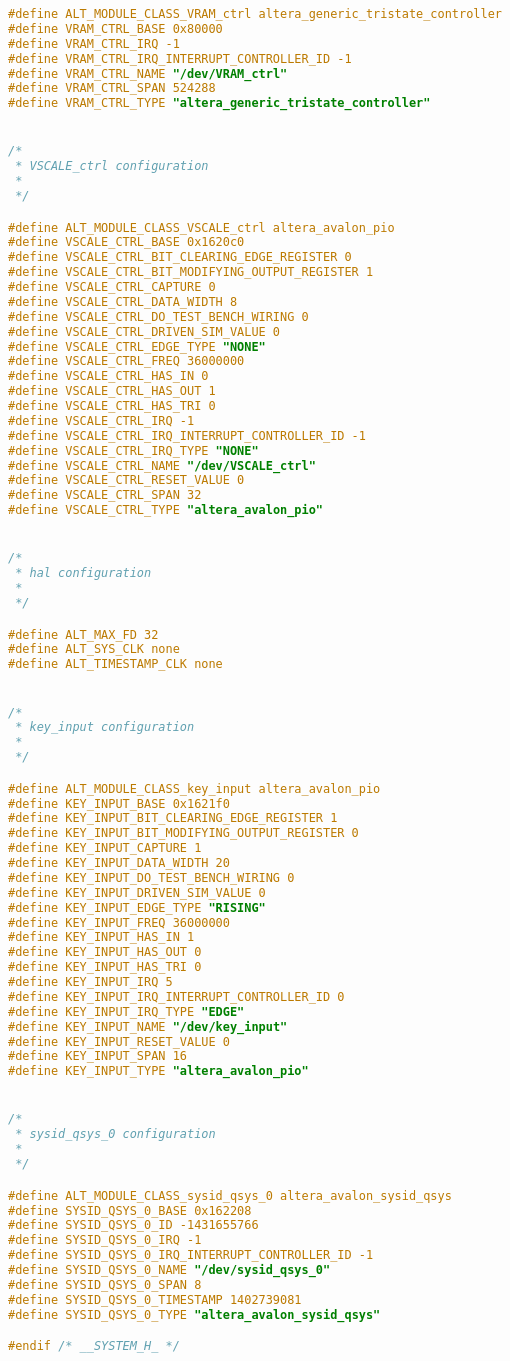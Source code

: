 \begin{lstlisting}[language=C]
#define ALT_MODULE_CLASS_VRAM_ctrl altera_generic_tristate_controller
#define VRAM_CTRL_BASE 0x80000
#define VRAM_CTRL_IRQ -1
#define VRAM_CTRL_IRQ_INTERRUPT_CONTROLLER_ID -1
#define VRAM_CTRL_NAME "/dev/VRAM_ctrl"
#define VRAM_CTRL_SPAN 524288
#define VRAM_CTRL_TYPE "altera_generic_tristate_controller"


/*
 * VSCALE_ctrl configuration
 *
 */

#define ALT_MODULE_CLASS_VSCALE_ctrl altera_avalon_pio
#define VSCALE_CTRL_BASE 0x1620c0
#define VSCALE_CTRL_BIT_CLEARING_EDGE_REGISTER 0
#define VSCALE_CTRL_BIT_MODIFYING_OUTPUT_REGISTER 1
#define VSCALE_CTRL_CAPTURE 0
#define VSCALE_CTRL_DATA_WIDTH 8
#define VSCALE_CTRL_DO_TEST_BENCH_WIRING 0
#define VSCALE_CTRL_DRIVEN_SIM_VALUE 0
#define VSCALE_CTRL_EDGE_TYPE "NONE"
#define VSCALE_CTRL_FREQ 36000000
#define VSCALE_CTRL_HAS_IN 0
#define VSCALE_CTRL_HAS_OUT 1
#define VSCALE_CTRL_HAS_TRI 0
#define VSCALE_CTRL_IRQ -1
#define VSCALE_CTRL_IRQ_INTERRUPT_CONTROLLER_ID -1
#define VSCALE_CTRL_IRQ_TYPE "NONE"
#define VSCALE_CTRL_NAME "/dev/VSCALE_ctrl"
#define VSCALE_CTRL_RESET_VALUE 0
#define VSCALE_CTRL_SPAN 32
#define VSCALE_CTRL_TYPE "altera_avalon_pio"


/*
 * hal configuration
 *
 */

#define ALT_MAX_FD 32
#define ALT_SYS_CLK none
#define ALT_TIMESTAMP_CLK none


/*
 * key_input configuration
 *
 */

#define ALT_MODULE_CLASS_key_input altera_avalon_pio
#define KEY_INPUT_BASE 0x1621f0
#define KEY_INPUT_BIT_CLEARING_EDGE_REGISTER 1
#define KEY_INPUT_BIT_MODIFYING_OUTPUT_REGISTER 0
#define KEY_INPUT_CAPTURE 1
#define KEY_INPUT_DATA_WIDTH 20
#define KEY_INPUT_DO_TEST_BENCH_WIRING 0
#define KEY_INPUT_DRIVEN_SIM_VALUE 0
#define KEY_INPUT_EDGE_TYPE "RISING"
#define KEY_INPUT_FREQ 36000000
#define KEY_INPUT_HAS_IN 1
#define KEY_INPUT_HAS_OUT 0
#define KEY_INPUT_HAS_TRI 0
#define KEY_INPUT_IRQ 5
#define KEY_INPUT_IRQ_INTERRUPT_CONTROLLER_ID 0
#define KEY_INPUT_IRQ_TYPE "EDGE"
#define KEY_INPUT_NAME "/dev/key_input"
#define KEY_INPUT_RESET_VALUE 0
#define KEY_INPUT_SPAN 16
#define KEY_INPUT_TYPE "altera_avalon_pio"


/*
 * sysid_qsys_0 configuration
 *
 */

#define ALT_MODULE_CLASS_sysid_qsys_0 altera_avalon_sysid_qsys
#define SYSID_QSYS_0_BASE 0x162208
#define SYSID_QSYS_0_ID -1431655766
#define SYSID_QSYS_0_IRQ -1
#define SYSID_QSYS_0_IRQ_INTERRUPT_CONTROLLER_ID -1
#define SYSID_QSYS_0_NAME "/dev/sysid_qsys_0"
#define SYSID_QSYS_0_SPAN 8
#define SYSID_QSYS_0_TIMESTAMP 1402739081
#define SYSID_QSYS_0_TYPE "altera_avalon_sysid_qsys"

#endif /* __SYSTEM_H_ */
\end{lstlisting}
